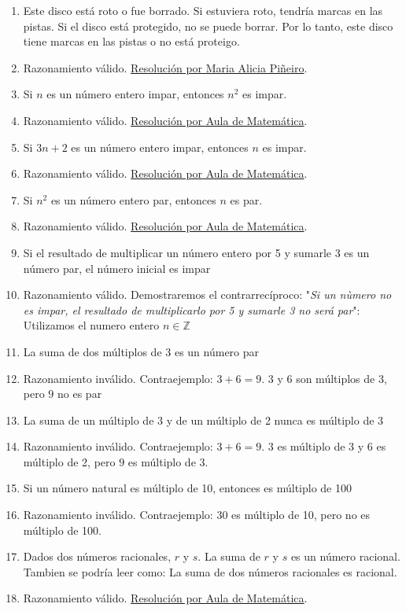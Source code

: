 \documentclass[a4paper]{article}
\newcommand{\answer}{\item[**]}
\begin{document}
\begin{enumerate}[resume]
\begin{enumerate} [label=(\alph*)]
		\item Este disco está roto o fue borrado. Si estuviera roto, tendría marcas en las pistas. Si el disco está protegido, no se puede borrar. Por lo tanto, este disco tiene marcas en las pistas o no está proteigo.
		\answer Razonamiento válido. \href{https://youtu.be/rEB0nEdSFXo}{Resolución por Maria Alicia Piñeiro}.

		\item Si $n$ es un número entero impar, entonces $n^2$ es impar.
		\answer Razonamiento válido. \href{https://youtu.be/yAGoR6FUyi8}{Resolución por Aula de Matemática}.

		\item Si $3n+2$ es un número entero impar, entonces $n$ es impar.
		\answer Razonamiento válido. \href{https://youtu.be/yAGoR6FUyi8?t=159}{Resolución por Aula de Matemática}.

		\item Si $n^2$ es un número entero par, entonces $n$ es par.
		\answer Razonamiento válido. \href{https://youtu.be/yAGoR6FUyi8?t=310}{Resolución por Aula de Matemática}.

		\item Si el resultado de multiplicar un número entero por 5 y sumarle 3 es un número par, el número inicial es impar
		\answer Razonamiento válido. Demostraremos el contrarrecíproco: "\textit{Si un nùmero no es impar, el resultado de multiplicarlo por 5 y sumarle 3 no será par}": Utilizamos el numero entero $n \in \mathbb{Z}$\\ 
		
		\item La suma de dos múltiplos de 3 es un número par
		\answer Razonamiento inválido. Contraejemplo: $3+6=9$. $3$ y $6$ son múltiplos de 3, pero $9$ no es par

		\item La suma de un múltiplo de 3 y de un múltiplo de 2 nunca es múltiplo de 3
		\answer Razonamiento inválido. Contraejemplo: $3+6=9$. $3$ es múltiplo de 3 y $6$ es múltiplo de 2, pero $9$ es múltiplo de 3.
		
		\item Si un número natural es múltiplo de 10, entonces es múltiplo de 100
		\answer Razonamiento inválido. Contraejemplo: $30$ es múltiplo de 10, pero no es múltiplo de 100.

		\item Dados dos números racionales, $r$ y $s$. La suma de $r$ y $s$ es un número racional. Tambien se podría leer como: La suma de dos números racionales es racional. 
		\answer Razonamiento válido. \href{https://youtu.be/wbGe5hIjFUo}{Resolución por Aula de Matemática}.


\end{enumerate}
\end{enumerate}
\end{document}
